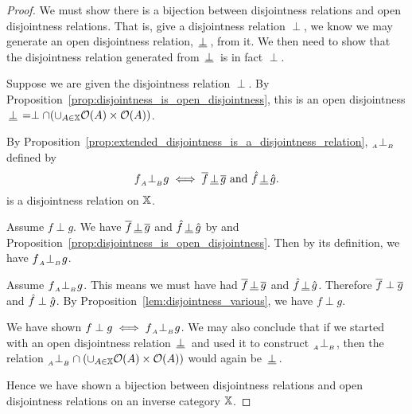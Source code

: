 \begin{proof}
  We must show there is a bijection between disjointness relations and open disjointness
  relations. That is, give a disjointness relation $\perp$, we know we may generate an open
  disjointness relation, $\,\underline{\perp}\,$, from it. We then need to show that the disjointness relation
  generated from $\,\underline{\perp}\,$ is in fact $\perp$.

  Suppose we are given the disjointness relation $\perp$. By
  Proposition~\ref{prop:disjointness_is_open_disjointness}, this is an open disjointness $\,\underline{\perp}\, =
  \perp \cap (\cup_{A\in\mathbb{X}}\mathcal{O}({A})\times\mathcal{O}({A}))$.

  By Proposition~\ref{prop:extended_disjointness_is_a_disjointness_relation}, ${}_{{}_{A}}{\perp_{{}_{B}}}$ defined by
  \[
    f{}_{{}_{A}}{\perp_{{}_{B}}} g \iff  \overline{f}\,\underline{\perp}\,\overline{g}  \text{ and }  \hat{f}\,\underline{\perp}\,\hat{g}.
  \]
  is a disjointness relation on $\mathbb{X}$.

  Assume $f\perp g$. We have $\overline{f}\,\underline{\perp}\,\overline{g}$ and $\hat{f}\,\underline{\perp}\,\hat{g}$ by
   and Proposition~\ref{prop:disjointness_is_open_disjointness}. Then by its
  definition, we have $f {}_{{}_{A}}{\perp_{{}_{B}}} g$.

  Assume $f {}_{{}_{A}}{\perp_{{}_{B}}} g$. This means we must have had $\overline{f}\,\underline{\perp}\,\overline{g}$ and
  $\hat{f}\,\underline{\perp}\,\hat{g}$. Therefore $\overline{f}\perp\overline{g}$ and  $\hat{f}\perp\hat{g}$. By
  Proposition~\ref{lem:disjointness_various}, we have $f \perp g$.

  We have shown $f \perp g \iff f{}_{{}_{A}}{\perp_{{}_{B}}} g$. We may also conclude that if we started with an open
  disjointness relation $\,\underline{\perp}\,$ and used it to construct ${}_{{}_{A}}{\perp_{{}_{B}}}$, then the relation ${}_{{}_{A}}{\perp_{{}_{B}}}
  \cap (\cup_{A\in\mathbb{X}}\mathcal{O}({A})\times\mathcal{O}({A}))$ would again be $\,\underline{\perp}\,$.

  Hence we have shown a bijection between disjointness relations and open disjointness relations on
  an inverse category $\mathbb{X}$.





\end{proof}



